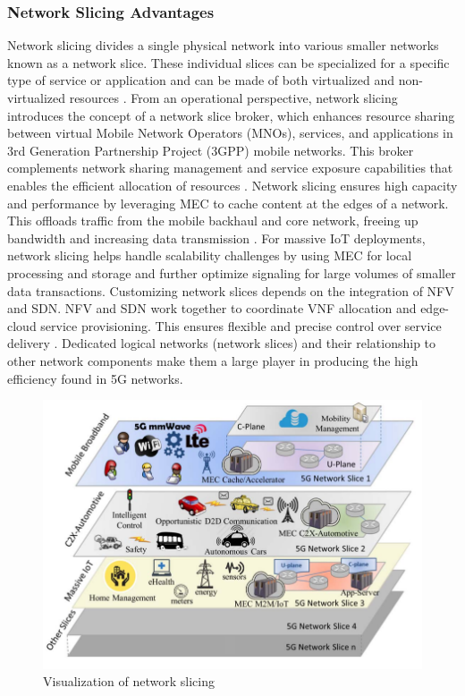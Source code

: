 \documentclass[acmtog]{acmart}
\begin{document}
\subsubsection{Network Slicing Advantages} Network slicing divides a single physical network into various smaller networks known as a network slice. These individual slices can be specialized for a specific type of service or application and can be made of both virtualized and non-virtualized resources \cite{ref7_1}. From an operational perspective, network slicing introduces the concept of a network slice broker, which enhances resource sharing between virtual Mobile Network Operators (MNOs), services, and applications in 3rd Generation Partnership Project (3GPP) mobile networks. This broker complements network sharing management and service exposure capabilities that enables the efficient allocation of resources \cite{ref6_1}. Network slicing ensures high capacity and performance by leveraging MEC to cache content at the edges of a network. This offloads traffic from the mobile backhaul and core network, freeing up bandwidth and increasing data transmission \cite{ref6_1}. For massive IoT deployments, network slicing helps handle scalability challenges by using MEC for local processing and storage and further optimize signaling for large volumes of smaller data transactions. Customizing network slices depends on the integration of NFV and SDN. NFV and SDN work together to coordinate VNF allocation and edge-cloud service provisioning. This ensures flexible and precise control over service delivery \cite{ref6_1}. Dedicated logical networks (network slices) and their relationship to other network components make them a large player in producing the high efficiency found in 5G networks.
\begin{figure}[h]
  \centering
  \includegraphics[width=\linewidth]{slice.png}
  \caption{Visualization of network slicing \cite{ref6_1}}
\end{figure}
\end{document}
